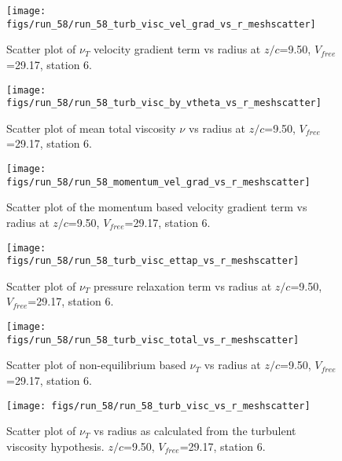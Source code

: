 \begin{figure}[H]
\centering
\texttt{[image: figs/run\_58/run\_58\_turb\_visc\_vel\_grad\_vs\_r\_meshscatter]}
\caption{Scatter plot of $\nu_T$ velocity gradient term vs radius at $z/c$=9.50, $V_{free}$=29.17, station 6.}
\end{figure}


\begin{figure}[H]
\centering
\texttt{[image: figs/run\_58/run\_58\_turb\_visc\_by\_vtheta\_vs\_r\_meshscatter]}
\caption{Scatter plot of mean total viscosity $\nu$ vs radius at $z/c$=9.50, $V_{free}$=29.17, station 6.}
\end{figure}


\begin{figure}[H]
\centering
\texttt{[image: figs/run\_58/run\_58\_momentum\_vel\_grad\_vs\_r\_meshscatter]}
\caption{Scatter plot of the momentum based velocity gradient term vs radius at $z/c$=9.50, $V_{free}$=29.17, station 6.}
\end{figure}


\begin{figure}[H]
\centering
\texttt{[image: figs/run\_58/run\_58\_turb\_visc\_ettap\_vs\_r\_meshscatter]}
\caption{Scatter plot of $\nu_T$ pressure relaxation term vs radius at $z/c$=9.50, $V_{free}$=29.17, station 6.}
\end{figure}


\begin{figure}[H]
\centering
\texttt{[image: figs/run\_58/run\_58\_turb\_visc\_total\_vs\_r\_meshscatter]}
\caption{Scatter plot of non-equilibrium based $\nu_T$ vs radius at $z/c$=9.50, $V_{free}$=29.17, station 6.}
\end{figure}


\begin{figure}[H]
\centering
\texttt{[image: figs/run\_58/run\_58\_turb\_visc\_vs\_r\_meshscatter]}
\caption{Scatter plot of $\nu_T$ vs radius as calculated from the turbulent viscosity hypothesis. $z/c$=9.50, $V_{free}$=29.17, station 6.}
\end{figure}


